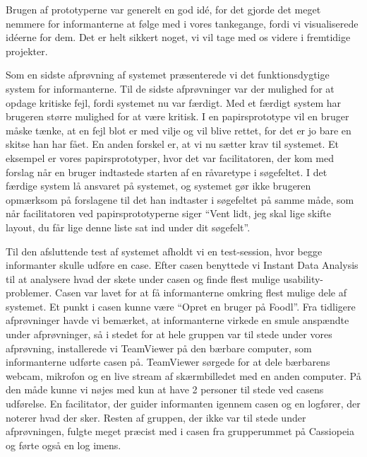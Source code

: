 Brugen af prototyperne var generelt en god idé, for det gjorde det meget nemmere for informanterne at følge med i vores tankegange, fordi vi visualiserede idéerne for dem. Det er helt sikkert noget, vi vil tage med os videre i fremtidige projekter.

Som en sidste afprøvning af systemet præsenterede vi det funktionsdygtige system for informanterne. 
Til de sidste afprøvninger var der mulighed for at opdage kritiske fejl, fordi systemet nu var færdigt. Med et færdigt system har brugeren større mulighed for at være kritisk. I en papirsprototype vil en bruger måske tænke, at en fejl blot er med vilje og vil blive rettet, for det er jo bare en skitse han har fået. En anden forskel er, at vi nu sætter krav til systemet. Et eksempel er vores papirsprototyper, hvor det var facilitatoren, der kom med forslag når en bruger indtastede starten af en råvaretype i søgefeltet. I det færdige system lå ansvaret på systemet, og systemet gør ikke brugeren opmærksom på forslagene til det han indtaster i søgefeltet på samme måde, som når facilitatoren ved papirsprototyperne siger ``Vent lidt, jeg skal lige skifte layout, du får lige denne liste sat ind under dit søgefelt''.

Til den afsluttende test af systemet afholdt vi en test-session, hvor begge informanter skulle udføre en case. Efter casen benyttede vi Instant Data Analysis\cite{debida} til at analysere hvad der skete under casen og finde flest mulige usability-problemer. Casen var lavet for at få informanterne omkring flest mulige dele af systemet. Et punkt i casen kunne \fx være ``Opret en bruger på Foodl''. Fra tidligere afprøvninger havde vi bemærket, at informanterne virkede en smule anspændte under afprøvninger, så i stedet for at hele gruppen var til stede under vores afprøvning, installerede vi TeamViewer på den bærbare computer, som informanterne udførte casen på. TeamViewer sørgede for at dele bærbarens webcam, mikrofon og en live stream af skærmbilledet med en anden computer. På den måde kunne vi nøjes med kun at have 2 personer til stede ved casens udførelse. En facilitator, der guider informanten igennem casen og en logfører, der noterer hvad der sker. Resten af gruppen, der ikke var til stede under afprøvningen, fulgte meget præcist med i casen fra grupperummet på Cassiopeia og førte også en log imens.

